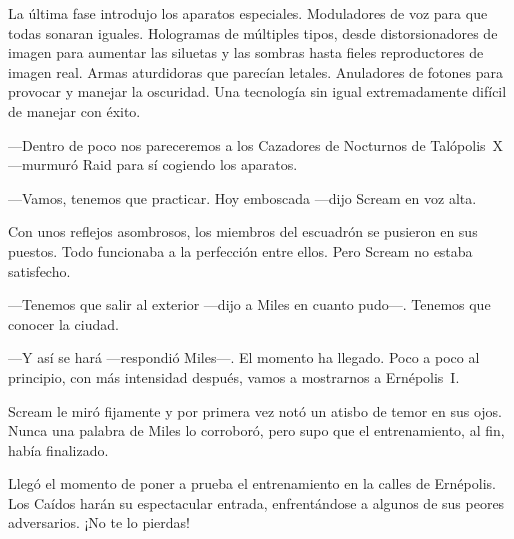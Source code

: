 La última fase introdujo los aparatos especiales. Moduladores de voz para que todas sonaran iguales. Hologramas de múltiples tipos, desde distorsionadores de imagen para aumentar las siluetas y las sombras hasta fieles reproductores de imagen real. Armas aturdidoras que parecían letales. Anuladores de fotones para provocar y manejar la oscuridad. Una tecnología sin igual extremadamente difícil de manejar con éxito.

---Dentro de poco nos pareceremos a los Cazadores de Nocturnos de Talópolis~X ---murmuró Raid para sí cogiendo los aparatos.

---Vamos, tenemos que practicar. Hoy emboscada ---dijo Scream en voz alta.

Con unos reflejos asombrosos, los miembros del escuadrón se pusieron en sus puestos. Todo funcionaba a la perfección entre ellos. Pero Scream no estaba satisfecho.

---Tenemos que salir al exterior ---dijo a Miles en cuanto pudo---. Tenemos que conocer la ciudad.

---Y así se hará ---respondió Miles---. El momento ha llegado. Poco a poco al principio, con más intensidad después, vamos a mostrarnos a Ernépolis~I.

Scream le miró fijamente y por primera vez notó un atisbo de temor en sus ojos. Nunca una palabra de Miles lo corroboró, pero supo que el entrenamiento, al fin, había finalizado.

\begin{next}
    Llegó el momento de poner a prueba el entrenamiento en la calles de Ernépolis. Los Caídos harán su espectacular entrada, enfrentándose a algunos de sus peores adversarios. ¡No te lo pierdas!
\end{next}

\endinput
